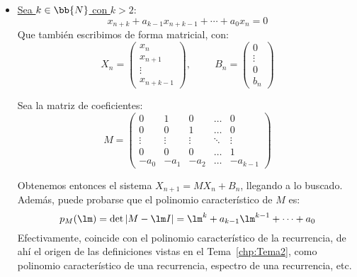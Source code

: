\begin{itemize}
    \item\ul{Sea $k\in \bb{N}$ con $k>2$}:
    \begin{equation*}
        x_{n+k} + a_{k-1} x_{n+k-1} + \cdots + a_0 x_n = 0
    \end{equation*}
    Que también escribimos de forma matricial, con:
    \begin{equation*}
        X_n = \left(\begin{array}{c}
            x_n \\
            x_{n+1} \\
            \vdots \\
            x_{n+k-1}
        \end{array}\right) ,\hspace{1cm}
        B_n = \left(\begin{array}{c}
            0 \\
            \vdots \\
            0 \\
            b_n
        \end{array}\right)
    \end{equation*}
    
    Sea la matriz de coeficientes:
    \begin{equation*}
        M = \left(\begin{array}{ccccc}
            0 & 1 & 0 & \ldots & 0 \\
            0 & 0 & 1 & \ldots & 0 \\
            \vdots & \vdots & \vdots & \ddots & \vdots \\
            0 & 0 & 0 & \ldots & 1 \\
            -a_0 & -a_1 & -a_2 & \ldots & -a_{k-1}
        \end{array}\right)
    \end{equation*}
    
    Obtenemos entonces el sistema $X_{n+1} = MX_n+B_n$, llegando a lo buscado. Además, puede probarse que el polinomio característico de $M$ es:
    \begin{equation*}
        p_M(\lm) = \det |M-\lm I| = \lm^k + a_{k-1}\lm^{k-1} + \cdots + a_0
    \end{equation*}
    Efectivamente, coincide con el polinomio característico de la recurrencia, de ahí el origen de las definiciones vistas en el Tema~\ref{chp:Tema2}, como polinomio característico de una recurrencia, espectro de una recurrencia, etc.
\end{itemize}


